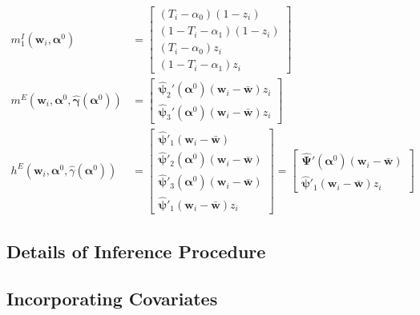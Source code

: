 \begin{align*}
  m_1^I(\mathbf{w}_i, \boldsymbol{\alpha}^0) &=
  \left[
  \begin{array}{r}
  (T_i - \alpha_0)(1 - z_i) \\
  (1 - T_i - \alpha_1)(1 - z_i) \\
  (T_i - \alpha_0) z_i \\
  (1 - T_i - \alpha_1) z_i
  \end{array}
\right]\\
  m^E\left(\mathbf{w}_i, \boldsymbol{\alpha}^0, \widehat{\boldsymbol{\gamma}}(\boldsymbol{\alpha}^0)\right) &= 
  \left[
  \begin{array}{c}
 \widehat{\boldsymbol{\psi}}_2'(\boldsymbol{\alpha}^0)(\mathbf{w}_i - \bar{\mathbf{w}})z_i \\
   \widehat{\boldsymbol{\psi}}_3'(\boldsymbol{\alpha}^0)(\mathbf{w}_i - \bar{\mathbf{w}})z_i 
  \end{array}
\right]\\
  h^E\left(\mathbf{w}_i, \boldsymbol{\alpha}^0, \widehat{\gamma}(\boldsymbol{\alpha}^0)\right) &= \left[
  \begin{array}{l}
    \widehat{\boldsymbol{\psi}}'_1 (\mathbf{w}_i - \bar{\mathbf{w}})\\ 
    \widehat{\boldsymbol{\psi}}'_2(\boldsymbol{\alpha}^0) (\mathbf{w}_i - \bar{\mathbf{w}})\\ 
    \widehat{\boldsymbol{\psi}}'_3(\boldsymbol{\alpha}^0) (\mathbf{w}_i - \bar{\mathbf{w}})\\
    \widehat{\boldsymbol{\psi}}'_1 (\mathbf{w}_i - \bar{\mathbf{w}})z_i
  \end{array}
\right] = \left[
\begin{array}{l}
  \widehat{\boldsymbol{\Psi}}'(\boldsymbol{\alpha}^0)(\mathbf{w}_i - \bar{\mathbf{w}})\\
    \widehat{\boldsymbol{\psi}}'_1 (\mathbf{w}_i - \bar{\mathbf{w}})z_i
\end{array}
\right]
\end{align*}


\subsection{Details of Inference Procedure}
\label{sec:details}

\subsection{Incorporating Covariates}
\label{sec:covariates}

